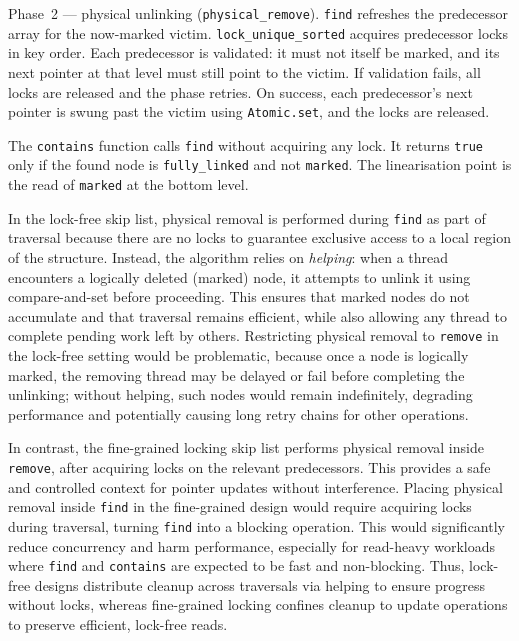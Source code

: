 \documentclass[11pt,a4paper]{article}
\begin{document}
Phase~2 — physical unlinking (\texttt{physical\_remove}).
\texttt{find} refreshes the predecessor array for the now-marked victim.
\texttt{lock\_unique\_sorted} acquires predecessor locks in key order.  Each
predecessor is validated: it must not itself be marked, and its next pointer at
that level must still point to the victim.  If validation fails, all locks are
released and the phase retries.  On success, each predecessor's next pointer is
swung past the victim using \texttt{Atomic.set}, and the locks are released.

The \texttt{contains} function calls \texttt{find} without acquiring any lock.  It returns
\texttt{true} only if the found node is \texttt{fully\_linked} and not
\texttt{marked}.  The linearisation point is the read of \texttt{marked} at
the bottom level.

\vspace{1em}

In the lock-free skip list, physical removal is performed during \texttt{find} as part of traversal because there are no locks to guarantee exclusive access to a local region of the structure. Instead, the algorithm relies on \emph{helping}: when a thread encounters a logically deleted (marked) node, it attempts to unlink it using compare-and-set before proceeding. This ensures that marked nodes do not accumulate and that traversal remains efficient, while also allowing any thread to complete pending work left by others. Restricting physical removal to \texttt{remove} in the lock-free setting would be problematic, because once a node is logically marked, the removing thread may be delayed or fail before completing the unlinking; without helping, such nodes would remain indefinitely, degrading performance and potentially causing long retry chains for other operations.

In contrast, the fine-grained locking skip list performs physical removal inside \texttt{remove}, after acquiring locks on the relevant predecessors. This provides a safe and controlled context for pointer updates without interference. Placing physical removal inside \texttt{find} in the fine-grained design would require acquiring locks during traversal, turning \texttt{find} into a blocking operation. This would significantly reduce concurrency and harm performance, especially for read-heavy workloads where \texttt{find} and \texttt{contains} are expected to be fast and non-blocking. Thus, lock-free designs distribute cleanup across traversals via helping to ensure progress without locks, whereas fine-grained locking confines cleanup to update operations to preserve efficient, lock-free reads.
\end{document}
